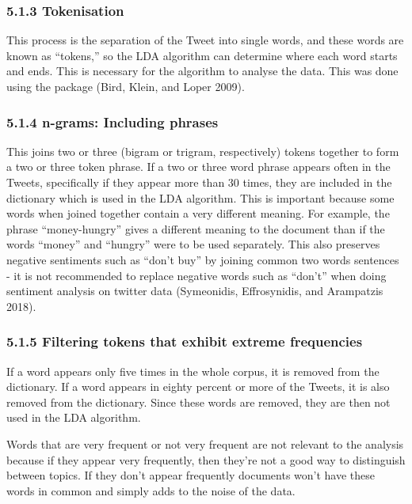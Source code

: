 \documentclass[
]{article}
\begin{document}
\hypertarget{tokenisation}{%
\subsubsection{5.1.3 Tokenisation}\label{tokenisation}}

This process is the separation of the Tweet into single words, and these
words are known as ``tokens,'' so the LDA algorithm can determine where
each word starts and ends. This is necessary for the algorithm to
analyse the data. This was done using the package (Bird, Klein, and
Loper 2009).

\hypertarget{n-grams-including-phrases}{%
\subsubsection{5.1.4 n-grams: Including
phrases}\label{n-grams-including-phrases}}

This joins two or three (bigram or trigram, respectively) tokens
together to form a two or three token phrase. If a two or three word
phrase appears often in the Tweets, specifically if they appear more
than 30 times, they are included in the dictionary which is used in the
LDA algorithm. This is important because some words when joined together
contain a very different meaning. For example, the phrase
``money-hungry'' gives a different meaning to the document than if the
words ``money'' and ``hungry'' were to be used separately. This also
preserves negative sentiments such as ``don't buy'' by joining common
two words sentences - it is not recommended to replace negative words
such as ``don't'' when doing sentiment analysis on twitter data
(Symeonidis, Effrosynidis, and Arampatzis 2018).

\hypertarget{filtering-tokens-that-exhibit-extreme-frequencies}{%
\subsubsection{5.1.5 Filtering tokens that exhibit extreme
frequencies}\label{filtering-tokens-that-exhibit-extreme-frequencies}}

If a word appears only five times in the whole corpus, it is removed
from the dictionary. If a word appears in eighty percent or more of the
Tweets, it is also removed from the dictionary. Since these words are
removed, they are then not used in the LDA algorithm.

Words that are very frequent or not very frequent are not relevant to
the analysis because if they appear very frequently, then they're not a
good way to distinguish between topics. If they don't appear frequently
documents won't have these words in common and simply adds to the noise
of the data.
\end{document}
